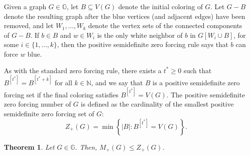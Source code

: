 \documentclass{article}
\newtheorem{theorem}{Theorem}[section]
\theoremstyle{definition}
\newcommand\abs[1]{\left|#1\right|}
\begin{document}
Given a graph $G\in\mathbb{G}$, let $B\subseteq V(G)$ denote the initial coloring of $G$. 
Let $G-B$ denote the resulting graph after the blue vertices (and adjacent edges) have been removed, and let $W_{1},\ldots,W_{k}$ denote the vertex sets of the connected components of $G-B$.
If $b\in B$ and $w\in W_{i}$ is the only white neighbor of $b$ in $G[W_{i}\cup B]$, for some $i\in\{1,\ldots,k\}$, then the positive semidefinite zero forcing rule says that $b$ can force $w$ blue.

As with the standard zero forcing rule, there exists a $t^{*}\geq 0$ such that $B^{[t^{*}]} = B^{[t^{*}+k]}$ for all $k\in\mathbb{N}$, and we say that $B$ is a positive semidefinite zero forcing set if the final coloring satisfies $B^{[t^{*}]} = V(G)$.
The positive semidefinite zero forcing number of $G$ is defined as the cardinality of the smallest positive semidefinite zero forcing set of $G$:
\[
Z_{+}(G) = \min\left\{\abs{B}\colon B^{[t^{*}]} = V(G)\right\}.
\]
\begin{theorem}\label{thm:psd-max-nul-zero-forcing}
Let $G\in\mathbb{G}$.
Then, $M_{+}(G)\leq Z_{+}(G)$.
\end{theorem}
\end{document}
